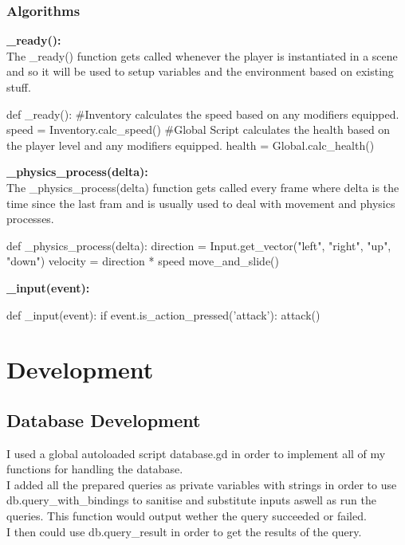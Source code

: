 \documentclass{article}
\begin{document}
        \subsubsection{Algorithms}
        \textbf{\_ready():}\\
        The \_ready() function gets called whenever the player is instantiated in a scene and so it will be used to setup variables and the environment based on existing stuff.\\
        \begin{python}
def _ready():
        #Inventory calculates the speed based on any modifiers equipped.
        speed = Inventory.calc_speed() 
        #Global Script calculates the health based on the player level and any modifiers equipped.
        health = Global.calc_health()
        \end{python}
        \textbf{\_physics\_process(delta):}\\
        The \_physics\_process(delta) function gets called every frame where delta is the time since the last fram and is usually used to deal with movement and physics processes.\\
        \begin{python}
def _physics_process(delta):
   direction = Input.get_vector("left", "right", "up", "down")
   velocity = direction * speed
   move_and_slide()
        \end{python}
        \textbf{\_input(event):}\\
        \begin{python}
def _input(event):
   if event.is_action_pressed('attack'):
      attack()
        \end{python}
\section{Development}
        \subsection{Database Development}
        I used a global autoloaded script database.gd in order to implement all of my functions for handling the database.\\
        I added all the prepared queries as private variables with strings in order to use db.query\_with\_bindings to sanitise and substitute inputs aswell as run the queries. This function would output wether the query succeeded or failed.\\
        I then could use db.query\_result in order to get the results of the query.\\
\end{document}

